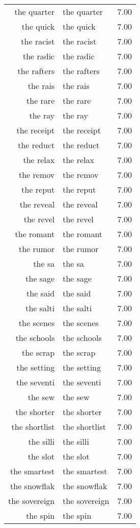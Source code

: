 \begin{table}[ht]
\begin{tabular}{rlr}
  the quarter & the quarter & 7.00 \\ 
  the quick & the quick & 7.00 \\ 
  the racist & the racist & 7.00 \\ 
  the radic & the radic & 7.00 \\ 
  the rafters & the rafters & 7.00 \\ 
  the rais & the rais & 7.00 \\ 
  the rare & the rare & 7.00 \\ 
  the ray & the ray & 7.00 \\ 
  the receipt & the receipt & 7.00 \\ 
  the reduct & the reduct & 7.00 \\ 
  the relax & the relax & 7.00 \\ 
  the remov & the remov & 7.00 \\ 
  the reput & the reput & 7.00 \\ 
  the reveal & the reveal & 7.00 \\ 
  the revel & the revel & 7.00 \\ 
  the romant & the romant & 7.00 \\ 
  the rumor & the rumor & 7.00 \\ 
  the sa & the sa & 7.00 \\ 
  the sage & the sage & 7.00 \\ 
  the said & the said & 7.00 \\ 
  the salti & the salti & 7.00 \\ 
  the scenes & the scenes & 7.00 \\ 
  the schools & the schools & 7.00 \\ 
  the scrap & the scrap & 7.00 \\ 
  the setting & the setting & 7.00 \\ 
  the seventi & the seventi & 7.00 \\ 
  the sew & the sew & 7.00 \\ 
  the shorter & the shorter & 7.00 \\ 
  the shortlist & the shortlist & 7.00 \\ 
  the silli & the silli & 7.00 \\ 
  the slot & the slot & 7.00 \\ 
  the smartest & the smartest & 7.00 \\ 
  the snowflak & the snowflak & 7.00 \\ 
  the sovereign & the sovereign & 7.00 \\ 
  the spin & the spin & 7.00 \\ 

\end{tabular}
\end{table}
